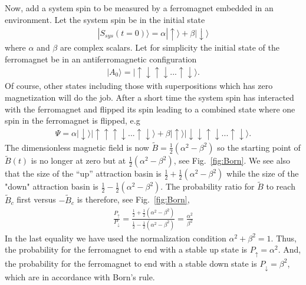 \documentclass[showpacs,preprintnumbers,amsmath,amssymb,12pt]{revtex4-2}
\begin{document}
Now, add a system spin to be measured by a ferromagnet embedded in an
environment. Let the system spin be in the initial state
\begin{eqnarray}
  |S_{sys}(t \!=\! 0) \rangle = \alpha |\uparrow \rangle + \beta | \downarrow 
  \rangle
\end{eqnarray}
where $\alpha$ and $\beta$ are complex scalars. Let for simplicity the
initial state of the ferromagnet be in an antiferromagnetic
configuration
\begin{eqnarray}
  |A_0 \rangle= |\uparrow \downarrow \uparrow \downarrow ... 
  \uparrow \downarrow \rangle.
\end{eqnarray}
Of course, other states including those with superpositions which has
zero magnetization will do the job. After a short time the system spin
has interacted with the ferromagnet and flipped its spin leading to a
combined state where one spin in the ferromagnet is flipped, e.g
\begin{eqnarray}
  \Psi = \alpha | \downarrow \rangle |\uparrow \uparrow \uparrow 
  \downarrow ... \uparrow \downarrow \rangle + \beta | \uparrow \rangle 
  |\downarrow \downarrow \uparrow \downarrow ... \uparrow \downarrow \rangle.
\end{eqnarray}
The dimensionless magnetic field is now $\tilde{B} =
\frac{1}{2}(\alpha^2 - \beta^2)$ so the starting point of
$\tilde{B}(t)$ is no longer at zero but at $\frac{1}{2}(\alpha^2 -
\beta^2)$, see Fig.~\ref{fig:Born}. We see also that the size of the
``up'' attraction basin is $\frac{1}{2} + \frac{1}{2}(\alpha^2 -
\beta^2)$ while the size of the "down" attraction basin is
$\frac{1}{2} - \frac{1}{2}(\alpha^2 - \beta^2)$. The probability ratio
for $\tilde{B}$ to reach $\tilde{B}_c$ first versus $-\tilde{B}_c$ is
therefore, see Fig.~\ref{fig:Born},
\begin{eqnarray}
  \frac{P_\uparrow}{P_\downarrow} = \frac{\frac{1}{2} + 
    \frac{1}{2}(\alpha^2 - \beta^2)}
  {\frac{1}{2} -  \frac{1}{2}(\alpha^2 - \beta^2)} = 
  \frac{\alpha^2}{\beta^2}
\end{eqnarray}
In the last equality we have used the normalization condition
$\alpha^2 + \beta^2 = 1$. Thus, the probability for the ferromagnet to
end with a stable up state is $P_\uparrow = \alpha^2$. And, the
probability for the ferromagnet to end with a stable down state is
$P_\downarrow = \beta^2$, which are in accordance with Born's rule.
\end{document}
